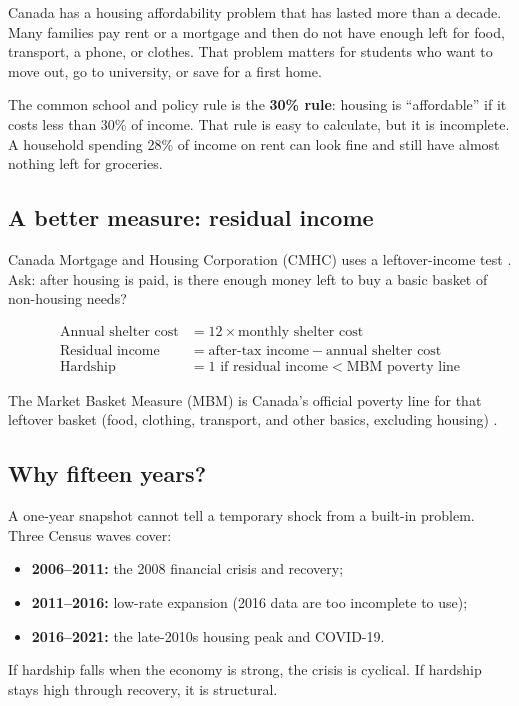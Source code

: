 \documentclass[11pt,letterpaper]{article}
\begin{document}
Canada has a housing affordability problem that has lasted more than a decade.
Many families pay rent or a mortgage and then do not have enough left for food, transport, a phone, or clothes.
That problem matters for students who want to move out, go to university, or save for a first home.

The common school and policy rule is the \textbf{30\% rule}: housing is ``affordable'' if it costs less than 30\% of income.
That rule is easy to calculate, but it is incomplete.
A household spending 28\% of income on rent can look fine and still have almost nothing left for groceries.

\subsection{A better measure: residual income}
\label{sec:ri}

Canada Mortgage and Housing Corporation (CMHC) uses a leftover-income test \cite{cmhc2024}.
Ask: after housing is paid, is there enough money left to buy a basic basket of non-housing needs?

\begin{align}
\text{Annual shelter cost} &= 12 \times \text{monthly shelter cost} \label{eq:shelter} \\
\text{Residual income} &= \text{after-tax income} - \text{annual shelter cost} \label{eq:ri} \\
\text{Hardship} &= 1 \text{ if residual income} < \text{MBM poverty line} \label{eq:hard}
\end{align}

The Market Basket Measure (MBM) is Canada's official poverty line for that leftover basket (food, clothing, transport, and other basics, excluding housing) \cite{statcan2021mbm}.

\subsection{Why fifteen years?}
\label{sec:why15}

A one-year snapshot cannot tell a temporary shock from a built-in problem.
Three Census waves cover:
\begin{itemize}[leftmargin=1.4em]
  \item \textbf{2006--2011:} the 2008 financial crisis and recovery;
  \item \textbf{2011--2016:} low-rate expansion (2016 data are too incomplete to use);
  \item \textbf{2016--2021:} the late-2010s housing peak and COVID-19.
\end{itemize}
If hardship falls when the economy is strong, the crisis is cyclical.
If hardship stays high through recovery, it is structural.
\end{document}
